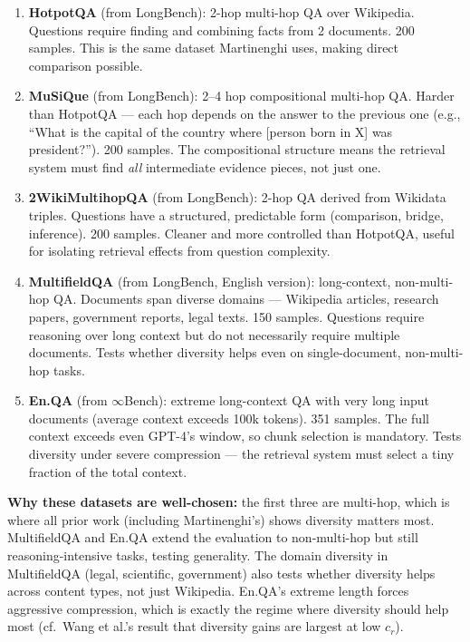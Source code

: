 \documentclass[11pt,a4paper]{article}
\begin{document}
\begin{enumerate}[leftmargin=*]
	\item \textbf{HotpotQA} (from LongBench): 2-hop multi-hop QA over Wikipedia. Questions require finding and combining facts from 2 documents. 200 samples. This is the same dataset Martinenghi uses, making direct comparison possible.

	\item \textbf{MuSiQue} (from LongBench): 2--4 hop compositional multi-hop QA. Harder than HotpotQA --- each hop depends on the answer to the previous one (e.g., ``What is the capital of the country where [person born in X] was president?''). 200 samples. The compositional structure means the retrieval system must find \emph{all} intermediate evidence pieces, not just one.

	\item \textbf{2WikiMultihopQA} (from LongBench): 2-hop QA derived from Wikidata triples. Questions have a structured, predictable form (comparison, bridge, inference). 200 samples. Cleaner and more controlled than HotpotQA, useful for isolating retrieval effects from question complexity.

	\item \textbf{MultifieldQA} (from LongBench, English version): long-context, non-multi-hop QA. Documents span diverse domains --- Wikipedia articles, research papers, government reports, legal texts. 150 samples. Questions require reasoning over long context but do not necessarily require multiple documents. Tests whether diversity helps even on single-document, non-multi-hop tasks.

	\item \textbf{En.QA} (from $\infty$Bench): extreme long-context QA with very long input documents (average context exceeds 100k tokens). 351 samples. The full context exceeds even GPT-4's window, so chunk selection is mandatory. Tests diversity under severe compression --- the retrieval system must select a tiny fraction of the total context.
\end{enumerate}

\medskip
\noindent\textbf{Why these datasets are well-chosen:} the first three are multi-hop, which is where all prior work (including Martinenghi's) shows diversity matters most. MultifieldQA and En.QA extend the evaluation to non-multi-hop but still reasoning-intensive tasks, testing generality. The domain diversity in MultifieldQA (legal, scientific, government) also tests whether diversity helps across content types, not just Wikipedia. En.QA's extreme length forces aggressive compression, which is exactly the regime where diversity should help most (cf.\ Wang et al.'s result that diversity gains are largest at low $c_r$).
\end{document}
